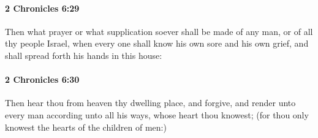		\paragraph{2 Chronicles 6:29} %
			\label{2CHRONICLES-6-29}

			Then what prayer or what supplication soever shall be made of any man, or of all thy people Israel, when every one shall know his own sore and his own grief, and shall spread forth his hands in this house:


		\paragraph{2 Chronicles 6:30} %
			\label{2CHRONICLES-6-30}

			Then hear thou from heaven thy dwelling place, and forgive, and render unto every man according unto all his ways, whose heart thou knowest; (for thou only knowest the hearts of the children of men:)

